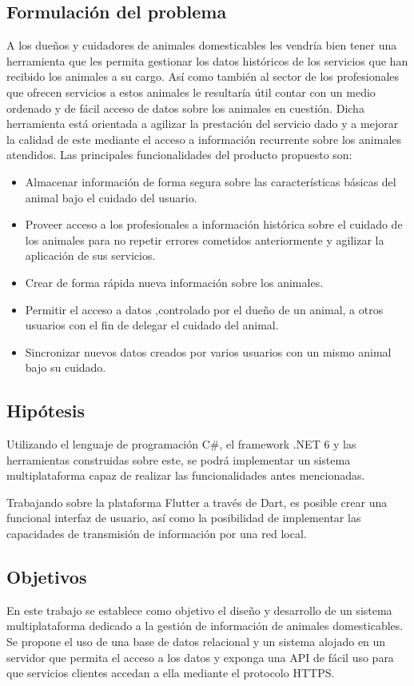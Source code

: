 \subsection*{Formulaci\'on del problema}
A los dueños y cuidadores de animales domesticables les vendría bien tener una herramienta que les permita gestionar los datos históricos de los servicios que han recibido los animales a su cargo. Así como también al sector de los profesionales que ofrecen servicios a estos animales le resultaría útil contar con un medio ordenado y de fácil acceso de datos sobre los animales en cuestión. Dicha herramienta está orientada a agilizar la prestación del servicio dado y a mejorar la calidad de este mediante el acceso a información recurrente sobre los animales atendidos. Las principales funcionalidades del producto propuesto son:
\begin{itemize}
\item Almacenar información de forma segura sobre las características básicas del animal bajo el cuidado del usuario.
\item Proveer acceso a los profesionales a información histórica sobre el cuidado de los animales para no repetir errores cometidos anteriormente y agilizar la aplicación de sus servicios.
\item Crear de forma rápida nueva información sobre los animales.
\item Permitir el acceso a datos ,controlado por el dueño de un animal, a otros usuarios con el fin de delegar el cuidado del animal.
\item Sincronizar nuevos datos creados por varios usuarios con un mismo animal bajo su cuidado.
\end{itemize}
\subsection*{Hip\'otesis}
Utilizando el lenguaje de programación C\#, el framework  .NET 6 y las herramientas construidas sobre este, se podrá implementar un sistema multiplataforma capaz de realizar las funcionalidades antes mencionadas.

Trabajando sobre la plataforma Flutter a trav\'es de Dart, es posible crear una funcional interfaz de usuario, as\'i como la posibilidad de implementar las capacidades de transmisi\'on de informaci\'on por una red local.
\subsection*{Objetivos}
En este trabajo se establece como objetivo el diseño y desarrollo de un sistema multiplataforma dedicado a la gestión de información de animales domesticables. Se propone el uso de una base de datos relacional y un sistema alojado en un servidor que permita el acceso a los datos y exponga una API de fácil uso para que servicios clientes accedan a ella mediante el protocolo HTTPS.
